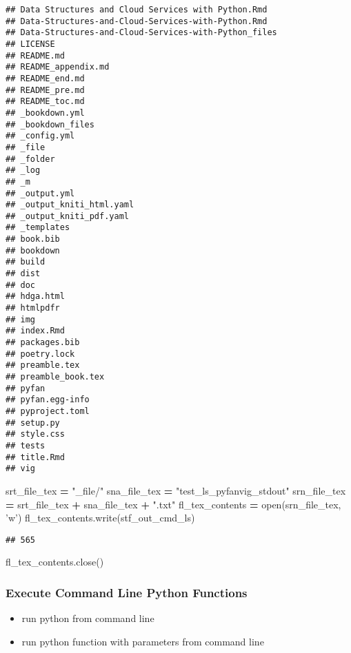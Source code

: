 \documentclass[
]{book}
\newenvironment{Shaded}{\begin{snugshade}}{\end{snugshade}}
\newcommand{\BuiltInTok}[1]{#1}
\newcommand{\NormalTok}[1]{#1}
\newcommand{\OperatorTok}[1]{\textcolor[rgb]{0.81,0.36,0.00}{\textbf{#1}}}
\newcommand{\StringTok}[1]{\textcolor[rgb]{0.31,0.60,0.02}{#1}}
\providecommand{\tightlist}{%
  \setlength{\itemsep}{0pt}\setlength{\parskip}{0pt}}
\begin{document}
\begin{verbatim}
## Data Structures and Cloud Services with Python.Rmd
## Data-Structures-and-Cloud-Services-with-Python.Rmd
## Data-Structures-and-Cloud-Services-with-Python_files
## LICENSE
## README.md
## README_appendix.md
## README_end.md
## README_pre.md
## README_toc.md
## _bookdown.yml
## _bookdown_files
## _config.yml
## _file
## _folder
## _log
## _m
## _output.yml
## _output_kniti_html.yaml
## _output_kniti_pdf.yaml
## _templates
## book.bib
## bookdown
## build
## dist
## doc
## hdga.html
## htmlpdfr
## img
## index.Rmd
## packages.bib
## poetry.lock
## preamble.tex
## preamble_book.tex
## pyfan
## pyfan.egg-info
## pyproject.toml
## setup.py
## style.css
## tests
## title.Rmd
## vig
\end{verbatim}

\begin{Shaded}
\begin{Highlighting}[]
\NormalTok{srt_file_tex }\OperatorTok{=} \StringTok{"_file/"}
\NormalTok{sna_file_tex }\OperatorTok{=} \StringTok{"test_ls_pyfanvig_stdout"}
\NormalTok{srn_file_tex }\OperatorTok{=}\NormalTok{ srt_file_tex }\OperatorTok{+}\NormalTok{ sna_file_tex }\OperatorTok{+} \StringTok{".txt"}
\NormalTok{fl_tex_contents }\OperatorTok{=} \BuiltInTok{open}\NormalTok{(srn_file_tex, }\StringTok{'w'}\NormalTok{)}
\NormalTok{fl_tex_contents.write(stf_out_cmd_ls)}
\end{Highlighting}
\end{Shaded}

\begin{verbatim}
## 565
\end{verbatim}

\begin{Shaded}
\begin{Highlighting}[]
\NormalTok{fl_tex_contents.close()}
\end{Highlighting}
\end{Shaded}

\hypertarget{execute-command-line-python-functions}{%
\subsubsection{Execute Command Line Python Functions}\label{execute-command-line-python-functions}}

\begin{itemize}
\tightlist
\item
  run python from command line
\item
  run python function with parameters from command line
\end{itemize}
\end{document}

